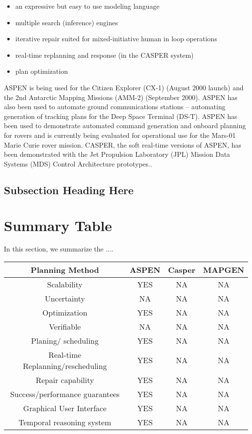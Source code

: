 \documentclass[conference]{IEEEtran}
\begin{document}
\begin{itemize}
  \item an expressive but easy to use modeling language
  \item multiple search (inference) engines
  \item iterative repair suited for mixed-initiative human in loop operations
  \item real-time replanning and response (in the CASPER system)
  \item plan optimization
\end{itemize}
 
 ASPEN is being used for the Citizen Explorer (CX-1) (August 2000 launch) and the 2nd Antarctic Mapping Missions (AMM-2) (September 2000). ASPEN has also been used to automate ground communications stations – automating generation of tracking plans for the Deep Space Terminal (DS-T). ASPEN has been used to demonstrate automated command generation and onboard planning for rovers and is currently being evaluated for operational use for the Mars-01 Marie Curie rover mission. CASPER, the soft real-time versions of ASPEN, has been demonstrated with the Jet Propulsion Laboratory (JPL) Mission Data Systems (MDS) Control Architecture prototypes..


\subsection{Subsection Heading Here}


\section{Summary Table}\label{sec:table}
In this section, we summarize the ....

\begin{center}
\begin {tabular}{ c|c|c|c }
 \hline
 \hline
Planning Method & ASPEN & Casper &MAPGEN\\
 \hline
Scalability   &YES   &NA   &NA\\
Uncertainty   &NA    &NA   &NA\\
Optimization   &YES    &NA   &NA\\
Verifiable    &NA &NA &NA\\
Planing/ scheduling &YES  &NA   &NA\\
Real-time Replanning/rescheduling &YES    &NA   &NA\\
Repair capability &YES    &NA   &NA\\
Success/performance guarantees &YES &NA &NA\\
Graphical User Interface &YES  &NA &NA\\
Temporal reasoning system  &YES &NA &NA \\
 \hline
\end{tabular}
\end{center}
\end{document}
